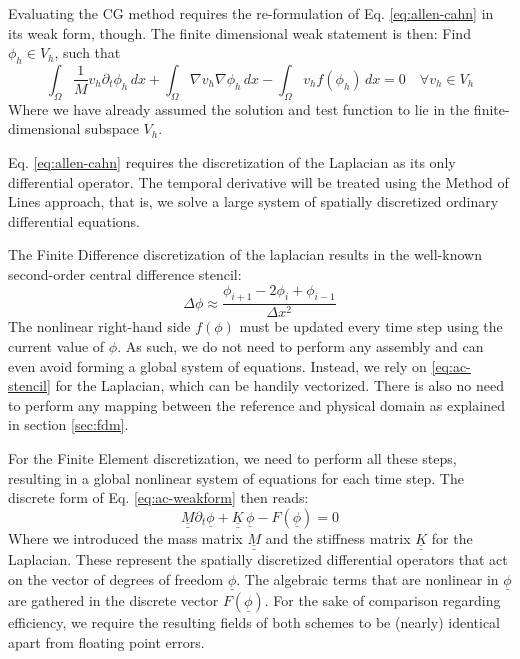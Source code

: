 \documentclass[asi,article,submit,moreauthors]{Definitions/mdpi}
\begin{document}
Evaluating the CG method requires the re-formulation of Eq. \ref{eq:allen-cahn} in its weak form, though.
The finite dimensional weak statement is then: Find $\phi_h \in V_h$, such that
\begin{equation}\label{eq:ac-weakform}
    \int_\Omega \frac{1}{M} v_h \partial_t \phi_h \,dx + \int_\Omega \nabla v_h \nabla \phi_h \,dx - \int_\Omega v_h f(\phi_h) \,dx = 0 \quad \forall v_h \in V_h
\end{equation}
Where we have already assumed the solution and test function to lie in the finite-dimensional subspace $V_h$.

Eq. \ref{eq:allen-cahn} requires the discretization of the Laplacian as its only differential operator.
The temporal derivative will be treated using the Method of Lines approach, that is,  we solve a large system of spatially discretized ordinary differential equations.

The Finite Difference discretization of the laplacian results in the well-known second-order central difference stencil:
\begin{equation} \label{eq:ac-stencil}
    \Delta \phi \approx \frac{\phi_{i+1} - 2 \phi_{i} + \phi_{i-1}}{\Delta x^2}
\end{equation}
The nonlinear right-hand side $f(\phi)$ must be updated every time step using the current value of $\phi$.
As such, we do not need to perform any assembly and can even avoid forming a global system of equations.
Instead, we rely on \ref{eq:ac-stencil} for the Laplacian, which can be handily vectorized.
There is also no need to perform any mapping between the reference and physical domain as explained in section \ref{sec:fdm}.

For the Finite Element discretization, we need to perform all these steps, resulting in a global nonlinear system of equations for each time step. The discrete form of Eq. \ref{eq:ac-weakform} then reads:
\begin{equation}
    \underline{\underline{M}} \partial_t \underline{\phi} + \underline{\underline{K}} \, \underline{\phi} - F(\underline{\phi}) = 0
\end{equation}
Where we introduced the mass matrix $\underline{\underline{M}}$ and the stiffness matrix $\underline{\underline{K}}$ for the Laplacian.
These represent the spatially discretized differential operators that act on the vector of degrees of freedom $\underline{\phi}$.
The algebraic terms that are nonlinear in $\underline{\phi}$ are gathered in the discrete vector $F(\underline{\phi})$.
For the sake of comparison regarding efficiency, we require the resulting fields of both schemes to be (nearly) identical apart from floating point errors. 
\end{document}

